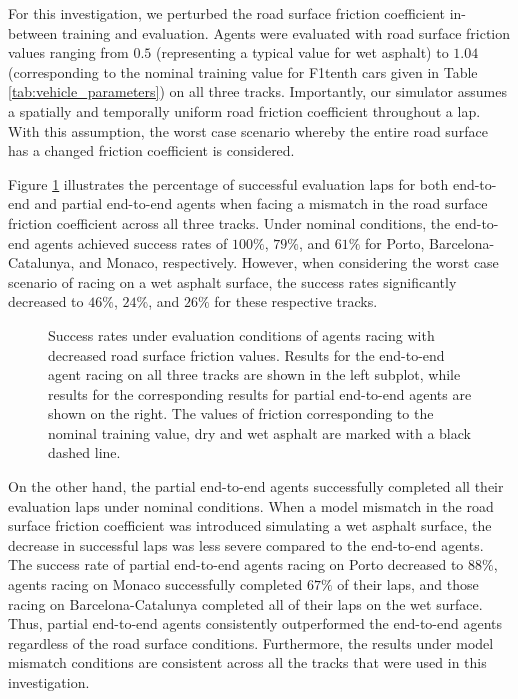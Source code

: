 For this investigation, we perturbed the road surface friction coefficient in-between training and evaluation.
Agents were evaluated with road surface friction values ranging from $0.5$ (representing a typical value for wet asphalt) to $1.04$ (corresponding to the nominal training value for F1tenth cars given in Table \ref{tab:vehicle_parameters}) on all three tracks. 
Importantly, our simulator assumes a spatially and temporally uniform road friction coefficient throughout a lap.
With this assumption, the worst case scenario whereby the entire road surface has a changed friction coefficient is considered.


Figure \ref{fig:mu} illustrates the percentage of successful evaluation laps for both end-to-end and partial end-to-end agents when facing a mismatch in the road surface friction coefficient across all three tracks. 
Under nominal conditions, the end-to-end agents achieved success rates of $100\%$, $79\%$, and $61\%$ for Porto, Barcelona-Catalunya, and Monaco, respectively. However, when considering the worst case scenario of racing on a wet asphalt surface, the success rates significantly decreased to $46\%$, $24\%$, and $26\%$ for these respective tracks.

\begin{figure}[htb!]
    \centering
    
    \caption[Success rate of agents under evaluation conditions with mismatched road surface friction coefficient]{Success rates under evaluation conditions of agents racing with decreased road surface friction values. Results for the end-to-end agent racing on all three tracks are shown in the left subplot, while results for the corresponding results for partial end-to-end agents are shown on the right. The values of friction corresponding to the nominal training value, dry and wet asphalt are marked with a black dashed line.}
    \label{fig:mu}
\end{figure}

On the other hand, the partial end-to-end agents successfully completed all their evaluation laps under nominal conditions. 
When a model mismatch in the road surface friction coefficient was introduced simulating a wet asphalt surface, the decrease in successful laps was less severe compared to the end-to-end agents. 
The success rate of partial end-to-end agents racing on Porto decreased to $88\%$, agents racing on Monaco successfully completed $67\%$ of their laps, and those racing on Barcelona-Catalunya completed all of their laps on the wet surface.
Thus, partial end-to-end agents consistently outperformed the end-to-end agents regardless of the road surface conditions.
Furthermore, the results under model mismatch conditions are consistent across all the tracks that were used in this investigation.

